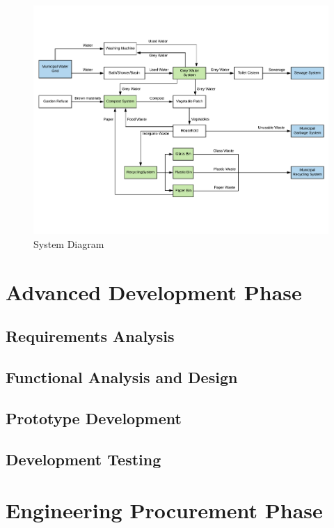 \documentclass[a4paper,11pt,fleqn]{report}
\begin{document}
\begin{figure}[h!]
\begin{center}
\includegraphics[scale = 0.55]{System_Diagram.pdf}
\caption{System Diagram}
\label{fig: systemDiagram}
\end{center}
\end{figure}


\section{Advanced Development Phase}

\subsection{Requirements Analysis}

\subsection{Functional Analysis and Design}

\subsection{Prototype Development}

\subsection{Development Testing}

\section{Engineering Procurement Phase}
\end{document}
